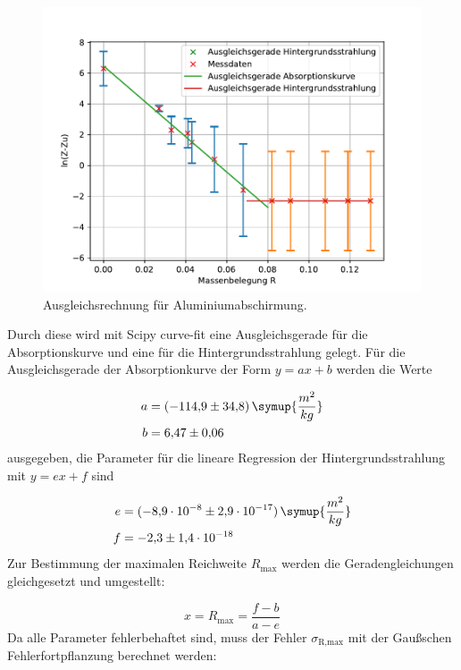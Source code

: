 \begin{figure}[h!tbp]
	\centering
	\includegraphics[width=0.8\linewidth]{alu.pdf}
	\caption{Ausgleichsrechnung für Aluminiumabschirmung.}
	\label{fig:aluminium}
\end{figure}
Durch diese wird mit Scipy curve-fit eine Ausgleichsgerade für die Absorptionskurve und eine für die Hintergrundsstrahlung gelegt.
Für die Ausgleichsgerade der Absorptionkurve der Form $y = ax + b$ werden die Werte

\begin{equation*}
\begin{aligned}
a &= (-114{,}9 \pm 34{,}8)\,\symup{\frac{m^2}{kg}} \\
b &= 6{,}47 \pm 0{,}06
\end{aligned}
\end{equation*}
ausgegeben, die Parameter für die lineare Regression der Hintergrundsstrahlung mit $y = ex + f$ sind

\begin{equation*}
\begin{aligned}
e &= (-8{,}9\cdot10^{-8} \pm 2{,}9\cdot10^{-17})\,\symup{\frac{m^2}{kg}} \\
f &= -2{,}3 \pm 1{,}4\cdot10^{-18}
\end{aligned}
\end{equation*}
Zur Bestimmung der maximalen Reichweite $R_{\text{max}}$ werden die Geradengleichungen gleichgesetzt und umgestellt:

\begin{equation}
x = R_{\text{max}} = \frac{f - b}{a - e}
\label{eq:reichweite}
\end{equation}
Da alle Parameter fehlerbehaftet sind, muss der Fehler $\sigma_{\text{R,max}}$ mit der Gaußschen Fehlerfortpflanzung berechnet werden:

